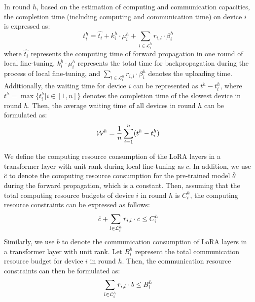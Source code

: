In round $h$, based on the estimation of computing and communication capacities, the completion time (including computing and communication time) on device $i$ is expressed as:
\vspace{-0.3cm}
\begin{equation}
    t_i^h =  \hat{t_i} + k_i^h \cdot \mu_{i}^h + \sum_{l \in \mathcal{L}_i^h} r_{i,l} \cdot \beta_i^h
\end{equation}
where $\hat{t_i}$ represents the computing time of forward propagation in one round of local fine-tuning, $k_i^h \cdot \mu_{i}^h$ represents the total time for backpropagation during the process of local fine-tuning, and $\sum_{l \in \mathcal{L}_i^h} r_{i,l} \cdot \beta_i^h$ denotes the uploading time.
Additionally, the waiting time for device $i$ can be represented as $t^h - t_i^h$, where $t^h = \max\{ t_i^h| i \in [1, n] \}$ denotes the completion time of the slowest device in round $h$. 
Then, the average waiting time of all devices in round $h$ can be formulated as:
\begin{equation}
    \mathcal{W}^h = \frac{1}{n} \sum_{i = 1}^n (t^h - t_i^h)
    \vspace{-0.3cm}
\end{equation}

We define the computing resource consumption of the LoRA layers in a transformer layer with unit rank during local fine-tuning as $c$.
In addition, we use $\hat{c}$ to denote the computing resource consumption for the pre-trained model $\overline{\theta}$ during the forward propagation, which is a constant.
Then, assuming that the total computing resource budgets of device $i$ in round $h$ is $C_i^h$, the computing resource constraints can be expressed as follows:
\vspace{-0.2cm}
\begin{equation}
    \label{constrain-comp}
     \hat{c} + \sum_{l \in \mathcal{L}_i^h} r_{i,l} \cdot c \leq C_i^h
     \vspace{-0.3cm}
\end{equation}
Similarly, we use $b$ to denote the communication consumption of LoRA layers in a transformer layer with unit rank.
Let $B_i^h$ represent the total communication resource budget for device $i$ in round $h$. 
Then, the communication resource constraints can then be formulated as:
\vspace{-0.2cm}
\begin{equation}
    \label{constrain-comm}
    \sum_{l \in \mathcal{L}_i^h} r_{i,l} \cdot b \leq B_i^h
    \vspace{-0.3cm}
\end{equation}

